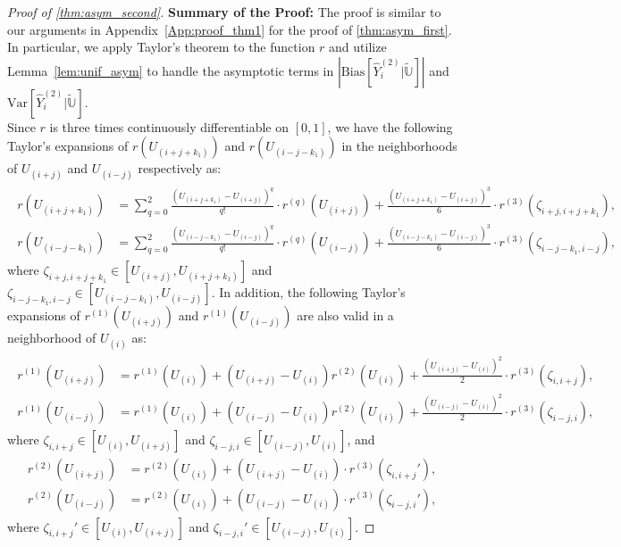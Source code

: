 \documentclass{uwstat572}
\theoremstyle{definition}
\renewcommand{\hat}{\widehat}
\renewcommand{\tilde}{\widetilde}
\theoremstyle{theorem}
\begin{document}
\begin{proof}[Proof of \autoref{thm:asym_second}]
{\bf Summary of the Proof:} The proof is similar to our arguments in Appendix~\ref{App:proof_thm1} for the proof of \autoref{thm:asym_first}. In particular, we apply Taylor's theorem to the function $r$ and utilize Lemma~\ref{lem:unif_asym} to handle the asymptotic terms in $\left|\mathrm{Bias}\left[\hat{Y}_i^{(2)} \big| \tilde{\mathbb{U}}\right] \right|$ and $\mathrm{Var}\left[\hat{Y}_i^{(2)} \big| \tilde{\mathbb{U}}\right]$.\\

Since $r$ is three times continuously differentiable on $[0,1]$, we have the following Taylor's expansions of $r(U_{(i+j+k_1)})$ and $r(U_{(i-j-k_1)})$ in the neighborhoods of $U_{(i+j)}$ and $U_{(i-j)}$ respectively as:
\begin{align}
\label{taylor1}
\begin{split}
r(U_{(i+j+k_1)}) &= \sum_{q=0}^2 \frac{\left(U_{(i+j+k_1)} - U_{(i+j)}\right)^q}{q!} \cdot r^{(q)}(U_{(i+j)}) + \frac{\left(U_{(i+j+k_1)} - U_{(i+j)}\right)^3}{6} \cdot r^{(3)}(\zeta_{i+j,i+j+k_1}),\\
r(U_{(i-j-k_1)}) &= \sum_{q=0}^2 \frac{\left(U_{(i-j-k_1)} - U_{(i-j)}\right)^q}{q!} \cdot r^{(q)}(U_{(i-j)}) + \frac{\left(U_{(i-j-k_1)} - U_{(i-j)}\right)^3}{6} \cdot r^{(3)}(\zeta_{i-j-k_1,i-j}),
\end{split}
\end{align}
where $\zeta_{i+j,i+j+k_1} \in \left[U_{(i+j)}, U_{(i+j+k_1)}\right]$ and $\zeta_{i-j-k_1,i-j} \in \left[U_{(i-j-k_1)}, U_{(i-j)}\right]$. In addition, the following Taylor's expansions of $r^{(1)}(U_{(i+j)})$ and $r^{(1)}(U_{(i-j)})$ are also valid in a neighborhood of $U_{(i)}$ as:
\begin{align}
\label{taylor2}
\begin{split}
r^{(1)}(U_{(i+j)}) &= r^{(1)}(U_{(i)}) + \left(U_{(i+j)} -U_{(i)}\right) r^{(2)}(U_{(i)}) + \frac{\left(U_{(i+j)} - U_{(i)}\right)^2}{2} \cdot r^{(3)}(\zeta_{i,i+j}), \\
r^{(1)}(U_{(i-j)}) &= r^{(1)}(U_{(i)}) + \left(U_{(i-j)} -U_{(i)}\right) r^{(2)}(U_{(i)}) + \frac{\left(U_{(i-j)} - U_{(i)}\right)^2}{2} \cdot r^{(3)}(\zeta_{i-j,i}),
\end{split}
\end{align}
where $\zeta_{i,i+j}\in \left[U_{(i)}, U_{(i+j)}\right]$ and $\zeta_{i-j,i} \in \left[U_{(i-j)}, U_{(i)}\right]$, and
\begin{align}
\label{taylor3}
\begin{split}
r^{(2)}(U_{(i+j)}) &= r^{(2)}(U_{(i)}) + \left(U_{(i+j)} - U_{(i)}\right) \cdot r^{(3)}(\zeta_{i,i+j}'), \\
r^{(2)}(U_{(i-j)}) &= r^{(2)}(U_{(i)}) + \left(U_{(i-j)} - U_{(i)}\right) \cdot r^{(3)}(\zeta_{i-j,i}'),
\end{split}
\end{align}
where $\zeta_{i,i+j}'\in \left[U_{(i)}, U_{(i+j)}\right]$ and $\zeta_{i-j,i}' \in \left[U_{(i-j)}, U_{(i)}\right]$. 


\end{proof}
\end{document}
